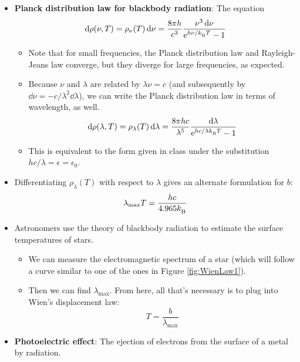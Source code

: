 \documentclass[../notes.tex]{subfiles}
\begin{document}
\begin{itemize}
    \item \textbf{Planck distribution law for blackbody radiation}: The equation
    \begin{equation*}
        \dd{\rho(\nu,T)} = \rho_\nu(T)\dd{\nu} = \frac{8\pi h}{c^3}\frac{\nu^3\dd{\nu}}{\e[h\nu/\kB T]-1}
    \end{equation*}
    \begin{itemize}
        \item Note that for small frequencies, the Planck distribution law and Rayleigh-Jeans law converge, but they diverge for large frequencies, as expected.
        \item Because $\nu$ and $\lambda$ are related by $\lambda\nu=c$ (and subsequently by $\dd{\nu}=-c/\lambda^2\dd{\lambda}$), we can write the Planck distribution law in terms of wavelength, as well.
        \begin{equation*}
            \dd{\rho(\lambda,T)} = \rho_\lambda(T)\dd{\lambda} = \frac{8\pi hc}{\lambda^5}\frac{\dd{\lambda}}{\e[hc/\lambda\kB T]-1}
        \end{equation*}
        \item This is equivalent to the form given in class under the substitution $hc/\lambda=\epsilon=\epsilon_0$.
    \end{itemize}
    \item Differentiating $\rho_\lambda(T)$ with respect to $\lambda$ gives an alternate formulation for $b$:
    \begin{equation*}
        \lambda_\text{max}T = \frac{hc}{4.965\kB}
    \end{equation*}
    \item Astronomers use the theory of blackbody radiation to estimate the surface temperatures of stars.
    \begin{itemize}
        \item We can measure the electromagnetic spectrum of a star (which will follow a curve similar to one of the ones in Figure \ref{fig:WienLaw1}).
        \item Then we can find $\lambda_\text{max}$. From here, all that's necessary is to plug into Wien's displacement law:
        \begin{equation*}
            T = \frac{b}{\lambda_\text{max}}
        \end{equation*}
    \end{itemize}
    \item {}\textbf{Photoelectric effect}: The ejection of electrons from the surface of a metal by radiation.

\end{itemize}
\end{document}
